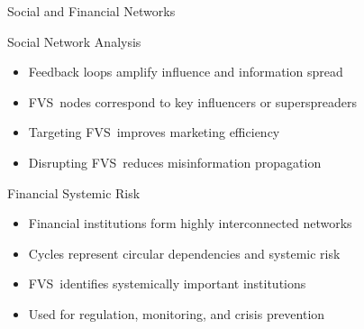 \documentclass[aspectratio=169]{beamer}
\newcommand{\fvs}{\textsc{FVS}}
\begin{document}
\begin{frame}{Social and Financial Networks}

	\begin{block}{Social Network Analysis}
		\begin{itemize}
			\item Feedback loops amplify influence and information spread
			\item \fvs\ nodes correspond to key influencers or superspreaders
			\item Targeting \fvs\ improves marketing efficiency
			\item Disrupting \fvs\ reduces misinformation propagation
		\end{itemize}
	\end{block}

	\begin{block}{Financial Systemic Risk}
		\begin{itemize}
			\item Financial institutions form highly interconnected networks
			\item Cycles represent circular dependencies and systemic risk
			\item \fvs\ identifies systemically important institutions
			\item Used for regulation, monitoring, and crisis prevention
		\end{itemize}
	\end{block}
\end{frame}
\end{document}
